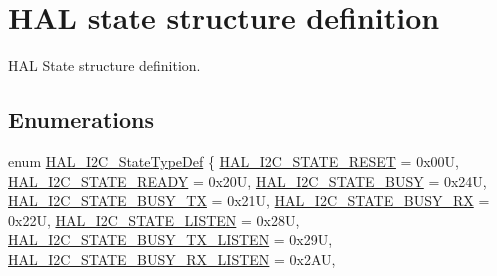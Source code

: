 \hypertarget{group___h_a_l__state__structure__definition}{}\section{H\+AL state structure definition}
\label{group___h_a_l__state__structure__definition}


H\+AL State structure definition.  


\subsection*{Enumerations}
\begin{DoxyCompactItemize}
\item 
enum \hyperlink{group___h_a_l__state__structure__definition_gaef355af8eab251ae2a19ee164ad81c37}{H\+A\+L\+\_\+\+I2\+C\+\_\+\+State\+Type\+Def} \{ \newline
\hyperlink{group___h_a_l__state__structure__definition_ggaef355af8eab251ae2a19ee164ad81c37a91ba08634e08d7287940f1bc5a37eeff}{H\+A\+L\+\_\+\+I2\+C\+\_\+\+S\+T\+A\+T\+E\+\_\+\+R\+E\+S\+ET} = 0x00U, 
\hyperlink{group___h_a_l__state__structure__definition_ggaef355af8eab251ae2a19ee164ad81c37af859ce60c5e462b0bfde3a5010bc72d1}{H\+A\+L\+\_\+\+I2\+C\+\_\+\+S\+T\+A\+T\+E\+\_\+\+R\+E\+A\+DY} = 0x20U, 
\hyperlink{group___h_a_l__state__structure__definition_ggaef355af8eab251ae2a19ee164ad81c37a0c503d6c0388f0d872b368557e278b5a}{H\+A\+L\+\_\+\+I2\+C\+\_\+\+S\+T\+A\+T\+E\+\_\+\+B\+U\+SY} = 0x24U, 
\hyperlink{group___h_a_l__state__structure__definition_ggaef355af8eab251ae2a19ee164ad81c37acb3a9e3d4d1076e0f4e65f91ca0161bc}{H\+A\+L\+\_\+\+I2\+C\+\_\+\+S\+T\+A\+T\+E\+\_\+\+B\+U\+S\+Y\+\_\+\+TX} = 0x21U, 
\newline
\hyperlink{group___h_a_l__state__structure__definition_ggaef355af8eab251ae2a19ee164ad81c37a4ea4ecc2dc3cb64c4877c123d9d73170}{H\+A\+L\+\_\+\+I2\+C\+\_\+\+S\+T\+A\+T\+E\+\_\+\+B\+U\+S\+Y\+\_\+\+RX} = 0x22U, 
\hyperlink{group___h_a_l__state__structure__definition_ggaef355af8eab251ae2a19ee164ad81c37a13518f06f54c7515100e86bb8d6e0779}{H\+A\+L\+\_\+\+I2\+C\+\_\+\+S\+T\+A\+T\+E\+\_\+\+L\+I\+S\+T\+EN} = 0x28U, 
\hyperlink{group___h_a_l__state__structure__definition_ggaef355af8eab251ae2a19ee164ad81c37a14d22553a60819b276582e08459f30b0}{H\+A\+L\+\_\+\+I2\+C\+\_\+\+S\+T\+A\+T\+E\+\_\+\+B\+U\+S\+Y\+\_\+\+T\+X\+\_\+\+L\+I\+S\+T\+EN} = 0x29U, 
\hyperlink{group___h_a_l__state__structure__definition_ggaef355af8eab251ae2a19ee164ad81c37a8aec2547eedf1c9924f8efed33e3b5c5}{H\+A\+L\+\_\+\+I2\+C\+\_\+\+S\+T\+A\+T\+E\+\_\+\+B\+U\+S\+Y\+\_\+\+R\+X\+\_\+\+L\+I\+S\+T\+EN} = 0x2\+AU, 

\end{DoxyCompactItemize}
